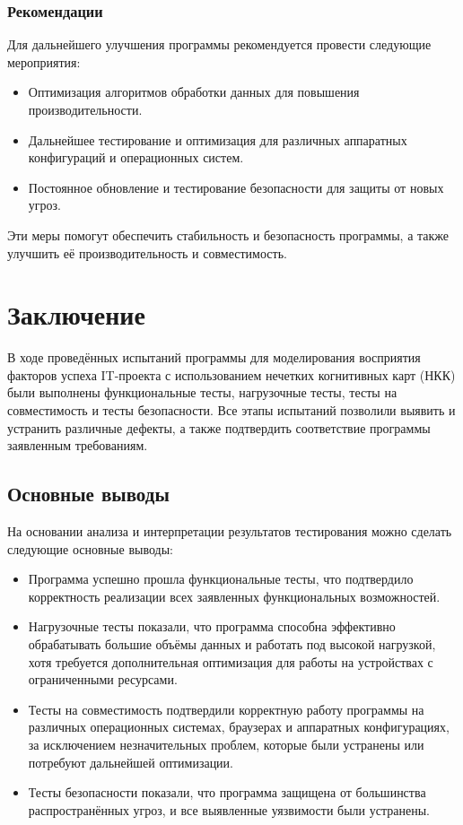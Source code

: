 \documentclass{article}
\begin{document}
\begin{itemize}
    \subsubsection{Рекомендации}

    Для дальнейшего улучшения программы рекомендуется провести следующие мероприятия:

    \begin{itemize}
        \item Оптимизация алгоритмов обработки данных для повышения производительности.
        \item Дальнейшее тестирование и оптимизация для различных аппаратных конфигураций и операционных систем.
        \item Постоянное обновление и тестирование безопасности для защиты от новых угроз.
    \end{itemize}

    Эти меры помогут обеспечить стабильность и безопасность программы, а также улучшить её производительность и совместимость.
    \newpage
    \section{Заключение}
    В ходе проведённых испытаний программы для моделирования восприятия факторов успеха IT-проекта с использованием нечетких когнитивных карт (НКК) были выполнены функциональные тесты, нагрузочные тесты, тесты на совместимость и тесты безопасности. Все этапы испытаний позволили выявить и устранить различные дефекты, а также подтвердить соответствие программы заявленным требованиям.

    \subsection{Основные выводы}

    На основании анализа и интерпретации результатов тестирования можно сделать следующие основные выводы:

    \begin{itemize}
        \item Программа успешно прошла функциональные тесты, что подтвердило корректность реализации всех заявленных функциональных возможностей.
        \item Нагрузочные тесты показали, что программа способна эффективно обрабатывать большие объёмы данных и работать под высокой нагрузкой, хотя требуется дополнительная оптимизация для работы на устройствах с ограниченными ресурсами.
        \item Тесты на совместимость подтвердили корректную работу программы на различных операционных системах, браузерах и аппаратных конфигурациях, за исключением незначительных проблем, которые были устранены или потребуют дальнейшей оптимизации.
        \item Тесты безопасности показали, что программа защищена от большинства распространённых угроз, и все выявленные уязвимости были устранены.
    \end{itemize}


\end{itemize}
\end{document}
